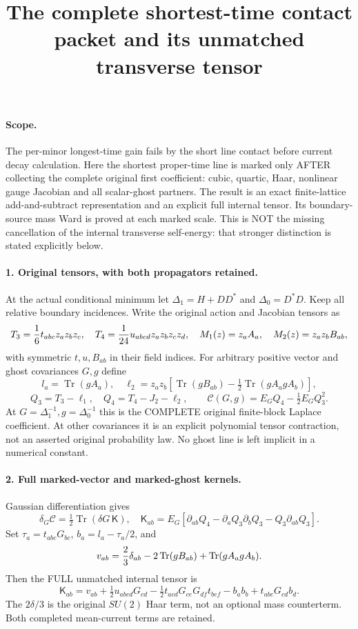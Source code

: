 \documentclass[11pt]{article}
\title{The complete shortest-time contact packet and its unmatched transverse tensor}\author{}\date{}
\begin{document}
\maketitle
\paragraph{Scope.}
The per-minor longest-time gain fails by the short line contact before current decay calculation. Here the shortest
proper-time line is marked only AFTER collecting the complete original
first coefficient: cubic, quartic, Haar, nonlinear gauge Jacobian and
all scalar-ghost partners. The result is an exact finite-lattice
add-and-subtract representation and an explicit full internal tensor.
Its boundary-source mass Ward is proved at each marked scale. This is
NOT the missing cancellation of the internal transverse self-energy:
that stronger distinction is stated explicitly below.

\paragraph{1. Original tensors, with both propagators retained.}
At the actual conditional minimum let
$\Delta_1=H+DD^*$ and $\Delta_0=D^*D$. Keep all relative boundary incidences.
Write the original action and Jacobian tensors as
\[
 T_3={1\over6}t_{abc}z_a z_b z_c,\quad
 T_4={1\over24}u_{abcd}z_a z_b z_c z_d,\quad
 M_1(z)=z_a A_a,\quad M_2(z)=z_a z_b B_{ab},
\]
with symmetric $t,u,B_{ab}$ in their field indices. For arbitrary positive
vector and ghost covariances $G,g$ define
\[
 l_a=\operatorname{Tr}(gA_a),\quad
 \ell_2=z_a z_b\left[\operatorname{Tr}(gB_{ab})
                    -\tfrac12\operatorname{Tr}(gA_agA_b)\right],
\]
\[
 Q_3=T_3-\ell_1,\quad Q_4=T_4-J_2-\ell_2,\qquad
 \mathcal C(G,g)=E_G Q_4-\tfrac12 E_G Q_3^2.                       \tag{1}
\]
At $G=\Delta_1^{-1},g=\Delta_0^{-1}$ this is the COMPLETE original
finite-block Laplace coefficient. At other covariances it is an explicit
polynomial tensor contraction, not an asserted original probability law.
No ghost line is left implicit in a numerical constant.

\paragraph{2. Full marked-vector and marked-ghost kernels.}
Gaussian differentiation gives
\[
 \delta_G\mathcal C=\tfrac12\operatorname{Tr}(\delta G\,\mathsf K),
 \quad
 \mathsf K_{ab}=E_G[\partial_{ab}Q_4
       -\partial_aQ_3\partial_bQ_3-Q_3\partial_{ab}Q_3].           \tag{2}
\]
Set $\tau_a=t_{abc}G_{bc}$, $b_a=l_a-\tau_a/2$, and
\[
 v_{ab}={2\over3}\delta_{ab}-2\operatorname{Tr}(gB_{ab})
                                    +\operatorname{Tr}(gA_agA_b).
\]
Then the FULL unmatched internal tensor is
\[
 \boxed{\mathsf K_{ab}=v_{ab}+\tfrac12u_{abcd}G_{cd}
 -\tfrac12t_{acd}G_{ce}G_{df}t_{bef}
 -b_ab_b+t_{abc}G_{cd}b_d.}                                      \tag{3}
\]
The $2\delta/3$ is the original $SU(2)$ Haar term, not an optional mass
counterterm. Both completed mean-current terms are retained.
\end{document}
